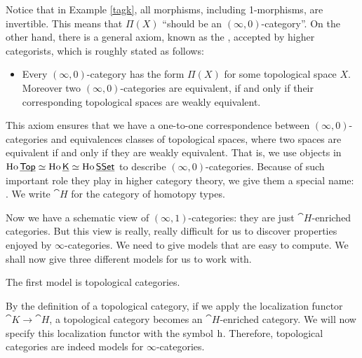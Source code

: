 Notice that in Example \ref{tagk}, all morphisms, including 1-morphisms, are invertible. This means that $\Pi(X)$ ``should be
an $(\infty,0)$-category''. On the other hand, there is a general axiom, known as the ,
accepted by higher categorists, which is roughly stated as follows:

\begin{itemize}
    \item Every $(\infty,0)$-category has the form $\Pi(X)$ for some topological space $X$. Moreover two $(\infty,0)$-categories 
    are equivalent, if and only if their corresponding topological spaces are weakly equivalent.
\end{itemize}

This axiom ensures that we have a one-to-one correspondence between $(\infty,0)$-categories and equivalences classes of topological spaces,
where two spaces are equivalent if and only if they are weakly equivalent. That is, we use objects 
in $\operatorname{Ho}\underline{\smash{\mathsf{Top}}}\simeq\operatorname{Ho}\underline{\smash{\mathsf{K}}}\simeq\operatorname{Ho}\underline{\smash{\mathsf{SSet}}}$ to describe $(\infty,0)$-categories. Because of such important role they play in
higher category theory, we give them a special name: . We write $\cat{H}$ for the category of homotopy types.

Now we have a schematic view of $(\infty,1)$-categories: they are just $\cat{H}$-enriched categories. But this view is really, really difficult
for us to discover properties enjoyed by $\infty$-categories. We need to give models that are easy to compute. We shall now give three 
different models for us to work with.

The first model is topological categories. 


By the definition of a topological category, if we apply the localization functor $\cat K\to\cat H$, a topological category becomes an
$\cat{H}$-enriched category. We will now specify this localization functor with the symbol $\mathrm{h}$. Therefore, topological categories are indeed
models for $\infty$-categories. 


